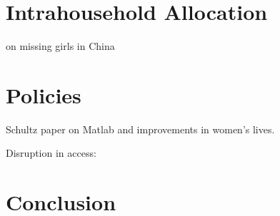 \documentclass[letterpaper,12pt]{article}
\begin{document}
\section{Intrahousehold Allocation}



\citet{Ashraf2014}

\cite{merli00} on missing girls in China



\section{Policies}


Schultz paper on Matlab and improvements in women's lives.

Disruption in access: \citet{Dumas2017}

\section{Conclusion}




\end{document}
